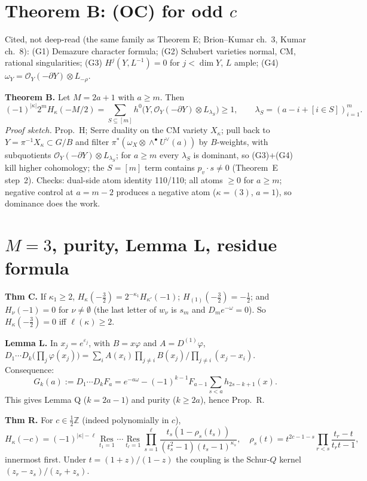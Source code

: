 \documentclass[10pt]{article}
\newcommand{\Res}{\operatorname*{Res}}
\begin{document}
\section{Theorem B: (OC) for odd $c$}

Cited, not deep-read (the same family as Theorem E; Brion--Kumar ch.~3, Kumar ch.~8):
(G1) Demazure character formula; (G2) Schubert varieties normal, CM, rational singularities;
(G3) $H^j(Y,L^{-1})=0$ for $j<\dim Y$, $L$ ample; (G4) $\omega_Y=\mathcal O_Y(-\partial Y)\otimes L_{-\rho}$.

\textbf{Theorem B.} Let $M=2a+1$ with $a\ge m$. Then
\[(-1)^{|\kappa|}2^mH_\kappa(-M/2)=\sum_{S\subseteq[m]}h^0\bigl(Y,\mathcal O_Y(-\partial Y)\otimes L_{\lambda_S}\bigr)\ge1,\qquad
\lambda_S=(a-i+[i\in S])_{i=1}^m .\]
\emph{Proof sketch.} Prop.~H; Serre duality on the CM variety $X_\kappa$; pull back to $Y=\pi^{-1}X_\kappa\subset G/B$ and filter
$\pi^*(\omega_X\otimes\wedge^\bullet U^\vee(a))$ by $B$-weights, with subquotients $\mathcal O_Y(-\partial Y)\otimes L_{\lambda_S}$; for
$a\ge m$ every $\lambda_S$ is dominant, so (G3)+(G4) kill higher cohomology; the $S=[m]$ term contains $p_v\cdot s\neq0$ (Theorem~E
step~2). Checks: dual-side atom identity 110/110; all atoms $\ge0$ for $a\ge m$; negative control at $a=m-2$ produces a negative
atom ($\kappa=(3)$, $a=1$), so dominance does the work.

\section{$M=3$, purity, Lemma L, residue formula}

\textbf{Thm C.} If $\kappa_1\ge2$, $H_\kappa(-\frac32)=2^{-\kappa_1}H_{\kappa'}(-1)$; $H_{(1)}(-\frac32)=-\frac12$; and $H_\nu(-1)=0$ for
$\nu\ne\emptyset$ (the last letter of $w_\nu$ is $s_m$ and $D_me^{-\omega}=0$). So $H_\kappa(-\frac32)=0$ iff $\ell(\kappa)\ge2$.

\textbf{Lemma L.} In $x_j=e^{\varepsilon_j}$, with $B=x\varphi$ and $A=D^{(1)}\varphi$,
$D_1\cdots D_k\bigl(\prod_j\varphi(x_j)\bigr)=\sum_iA(x_i)\prod_{j\ne i}B(x_j)/\prod_{j\ne i}(x_j-x_i)$. Consequence:
\[G_k(a):=D_1\cdots D_kF_a=e^{-a\omega}-(-1)^{k-1}F_{a-1}\sum_{s<a}h_{2s-k+1}(x).\]
This gives Lemma Q ($k=2a-1$) and purity ($k\ge2a$), hence Prop.~R.

\textbf{Thm R.} For $c\in\frac12\mathbb Z$ (indeed polynomially in $c$),
\[H_\kappa(-c)=(-1)^{|\kappa|-\ell}\Res_{t_1=1}\cdots\Res_{t_\ell=1}\prod_{s=1}^\ell\frac{t_s(1-\rho_s(t_s))}{(t_s^2-1)(t_s-1)^{\kappa_s}},\quad
\rho_s(t)=t^{2c-1-s}\prod_{r<s}\frac{t_r-t}{t_rt-1},\]
innermost first. Under $t=(1+z)/(1-z)$ the coupling is the Schur-$Q$ kernel $(z_r-z_s)/(z_r+z_s)$.
\end{document}
